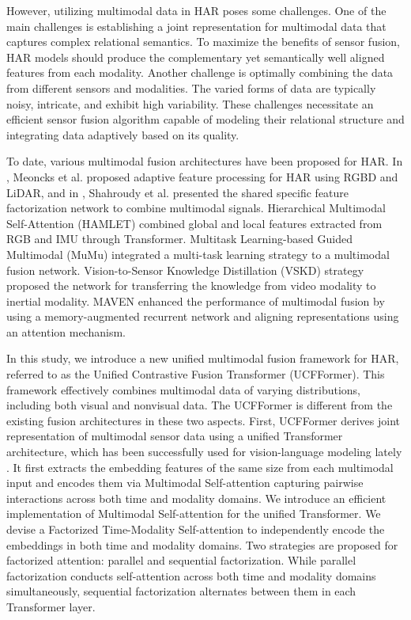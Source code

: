 However, utilizing multimodal data in HAR poses some challenges. One of the main challenges is establishing a joint representation for multimodal data that captures complex relational semantics. To maximize the benefits of sensor fusion, HAR models should produce the complementary yet semantically well aligned features from each modality.
Another challenge is optimally  combining the data from different sensors and modalities. The varied forms of data are typically noisy, intricate, and exhibit high variability. These challenges necessitate an efficient sensor fusion algorithm capable of modeling their relational structure and integrating data adaptively based on its quality.

To date, various multimodal fusion architectures have been proposed  for HAR. 
In \cite{moencks2019adaptive}, Meoncks et al.  proposed adaptive feature processing for HAR using RGBD and LiDAR, and in  \cite{shahroudy2017deep}, Shahroudy et al.  presented the shared specific feature factorization network to combine multimodal signals. Hierarchical Multimodal Self-Attention (HAMLET) \cite{islam2020hamlet} combined global and local features extracted from RGB and IMU through Transformer.
Multitask Learning-based Guided Multimodal (MuMu) \cite{islam2022mumu} integrated a multi-task learning strategy to a multimodal fusion network. 
Vision-to-Sensor Knowledge Distillation (VSKD) strategy \cite{ni2022cross} proposed the network for transferring the knowledge from video modality to inertial modality.
MAVEN \cite{islam2022maven} enhanced the performance of multimodal fusion by using a memory-augmented recurrent network and aligning representations using an attention mechanism.

In this study, we introduce  a new  unified multimodal fusion framework  for HAR, referred to as the Unified Contrastive Fusion Transformer (UCFFormer). This framework effectively combines multimodal data of varying distributions, including both visual and nonvisual data. The UCFFormer is different from the existing fusion architectures in these two aspects. First, UCFFormer derives joint representation of multimodal sensor data using a unified Transformer architecture, which has been successfully used for vision-language modeling  lately \cite{zhou2020unified}. It first extracts the embedding features of the same size from each multimodal input and encodes them via Multimodal Self-attention capturing pairwise interactions across both time and modality domains. 
We introduce an efficient implementation of Multimodal Self-attention for the unified Transformer. We devise a Factorized Time-Modality Self-attention to independently encode the embeddings in both time and modality domains. Two strategies are proposed for  factorized attention: parallel and sequential factorization. While parallel factorization conducts self-attention across both time and modality domains simultaneously, sequential factorization alternates between them in each Transformer layer.

